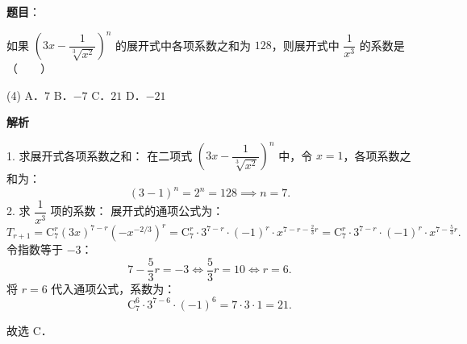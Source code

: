 \begin{answer}

\textbf{题目}：

如果 $\left(3x - \dfrac{1}{\sqrt[3]{x^2}}\right)^n$ 的展开式中各项系数之和为 $128$，则展开式中 $\dfrac{1}{x^3}$ 的系数是\mbox{（　　）}

\begin{gkopts}(4)
\task A．$7$
\task B．$-7$
\task C．$21$
\task D．$-21$
\end{gkopts}

\textbf{解析}

1. 求展开式各项系数之和：
在二项式 $\left(3x - \dfrac{1}{\sqrt[3]{x^2}}\right)^n$ 中，令 $x = 1$，各项系数之和为：
\nopagebreak[4]
\[
(3 - 1)^n = 2^n = 128 \implies n = 7.
\]
2. 求 $\dfrac{1}{x^3}$ 项的系数：
展开式的通项公式为：
\nopagebreak[4]
\[
T_{r+1} = \mathrm{C}_7^r (3x)^{7-r} \left(-x^{-2/3}\right)^r = \mathrm{C}_7^r \cdot 3^{7-r} \cdot (-1)^r \cdot x^{7 - r - \frac{2}{3}r} = \mathrm{C}_7^r \cdot 3^{7-r} \cdot (-1)^r \cdot x^{7 - \frac{5}{3}r}.
\]
令指数等于 $-3$：
\nopagebreak[4]
\[
7 - \dfrac{5}{3}r = -3 \iff \dfrac{5}{3}r = 10 \iff r = 6.
\]
将 $r = 6$ 代入通项公式，系数为：
\nopagebreak[4]
\[
\mathrm{C}_7^6 \cdot 3^{7-6} \cdot (-1)^6 = 7 \cdot 3 \cdot 1 = 21.
\]

故选 C．


\end{answer}
